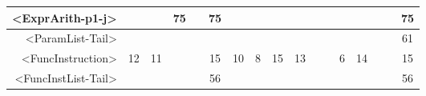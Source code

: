 \begin{tabular}{r|c@{ }c@{ }c@{ }c@{ }c@{ }c@{ }c@{ }c@{ }c@{ }c@{ }c@{ }c@{ }c@{ }c@{ }c@{ }c@{ }}
<ExprArith-p1-j> &   &   & 75 &   & 75 &   &   &   &   &   &   &   &   &   &   & 75 \\\hline
<ParamList-Tail> &   &   &   &   &   &   &   &   &   &   &   &   &   &   &   & 61 \\\hline
<FuncInstruction> & 12 & 11 &   &   & 15 & 10 & 8 & 15 & 13 &   &   & 6 & 14 &   &   & 15 \\\hline
<FuncInstList-Tail> &   &   &   &   & 56 &   &   &   &   &   &   &   &   &   &   & 56 \\\hline
\end{tabular}



